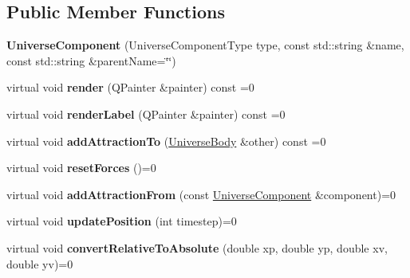 \subsection*{Public Member Functions}
\begin{DoxyCompactItemize}
\item 
{\bfseries Universe\+Component} (Universe\+Component\+Type type, const std\+::string \&name, const std\+::string \&parent\+Name=\char`\"{}\char`\"{})\hypertarget{classUniverseComponent_ae27a92b369e5eab3016d1a570766a974}{}\label{classUniverseComponent_ae27a92b369e5eab3016d1a570766a974}

\item 
virtual void {\bfseries render} (Q\+Painter \&painter) const =0\hypertarget{classUniverseComponent_ab5a74e2a809f24509770c85fcfb4f2c5}{}\label{classUniverseComponent_ab5a74e2a809f24509770c85fcfb4f2c5}

\item 
virtual void {\bfseries render\+Label} (Q\+Painter \&painter) const =0\hypertarget{classUniverseComponent_aa35a0218177fa8b0852cf041dbabd43a}{}\label{classUniverseComponent_aa35a0218177fa8b0852cf041dbabd43a}

\item 
virtual void {\bfseries add\+Attraction\+To} (\hyperlink{classUniverseBody}{Universe\+Body} \&other) const =0\hypertarget{classUniverseComponent_a1bee459df6e2e4ba2bdfee7ce0db1b1f}{}\label{classUniverseComponent_a1bee459df6e2e4ba2bdfee7ce0db1b1f}

\item 
virtual void {\bfseries reset\+Forces} ()=0\hypertarget{classUniverseComponent_a487cb9ffee239439d73216e413890c66}{}\label{classUniverseComponent_a487cb9ffee239439d73216e413890c66}

\item 
virtual void {\bfseries add\+Attraction\+From} (const \hyperlink{classUniverseComponent}{Universe\+Component} \&component)=0\hypertarget{classUniverseComponent_ad7d582f1e3cc26b30b25920820f006d4}{}\label{classUniverseComponent_ad7d582f1e3cc26b30b25920820f006d4}

\item 
virtual void {\bfseries update\+Position} (int timestep)=0\hypertarget{classUniverseComponent_aac0500ee56b3aecbdcddc663efc96aed}{}\label{classUniverseComponent_aac0500ee56b3aecbdcddc663efc96aed}

\item 
virtual void {\bfseries convert\+Relative\+To\+Absolute} (double xp, double yp, double xv, double yv)=0\hypertarget{classUniverseComponent_adee9b6dda24030f697c1c9dc76a066f9}{}\label{classUniverseComponent_adee9b6dda24030f697c1c9dc76a066f9}


\end{DoxyCompactItemize}
